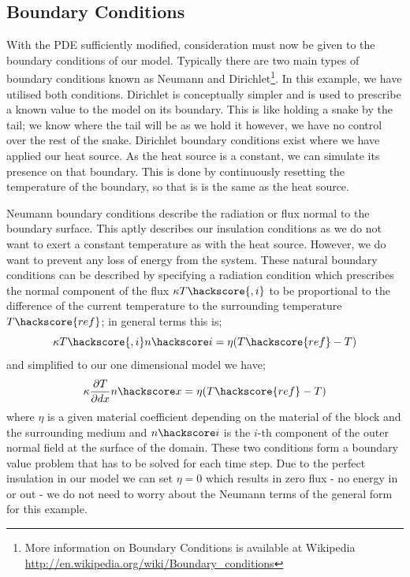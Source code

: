 \subsection{Boundary Conditions}
With the PDE sufficiently modified, consideration must now be given to the boundary conditions of our model. Typically there are two main types of boundary conditions known as Neumann and Dirichlet\footnote{More information on Boundary Conditions is available at Wikipedia \url{http://en.wikipedia.org/wiki/Boundary_conditions}}. In this example, we have utilised both conditions. Dirichlet is conceptually simpler and is used to prescribe a known value to the model on its boundary. This is like holding a snake by the tail; we know where the tail will be as we hold it however, we have no control over the rest of the snake. Dirichlet boundary conditions exist where we have applied our heat source. As the heat source is a constant, we can simulate its presence on that boundary. This is done by continuously resetting the temperature of the boundary, so that is is the same as the heat source.  

Neumann boundary conditions describe the radiation or flux normal to the boundary surface. This aptly describes our insulation conditions as we do not want to exert a constant temperature as with the heat source. However, we do want to prevent any loss of energy from the system. These natural boundary conditions can be described by specifying a radiation condition which prescribes the normal component of the flux $\kappa T\hackscore{,i}$ to be proportional
to the difference of the current temperature to the surrounding temperature $T\hackscore{ref}$; in general terms this is;
\begin{equation}
 \kappa T\hackscore{,i} n\hackscore i = \eta (T\hackscore{ref}-T) 
\label{eqn:hdbc}
\end{equation}
and simplified to our one dimensional model we have;
\begin{equation}
\kappa \frac{\partial T}{\partial dx} n\hackscore x = \eta (T\hackscore{ref}-T) 
\end{equation}
where $\eta$ is a given material coefficient depending on the material of the block and the surrounding medium and $n\hackscore i$ is the $i$-th component of the outer normal field  at the surface of the domain. These two conditions form a boundary value problem that has to be solved for each time step. Due to the perfect insulation in our model we can set $\eta = 0$ which results in zero flux - no energy in or out - we do not need to worry about the Neumann terms of the general form for this example.

